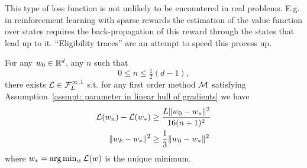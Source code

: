 \begin{remark}
	This type of loss function is not unlikely to be encountered in real
	problems. E.g. in reinforcement learning with sparse rewards the estimation
	of the value function over states requires the back-propagation of this
	reward through the states that lead up to it. ``Eligibility traces''
	\parencite[Chapter 12]{suttonReinforcementLearningIntroduction2018}
	are an attempt to speed this process up.
\end{remark}
\begin{theorem}\label{thm: convex function complexity bound}
	For any \(\weights_0\in\reals^d\), any \(n\) such that 
	\[0\le n\le \tfrac12 (d-1),\]
	there exists \(\Loss\in\lipGradientSet[\infty,1]{\ubound}\)
	s.t. for any first order method \(\firstOrderMethod\)
	satisfying Assumption~\ref{assmpt: parameter in linear hull of gradients}
	we have
	\begin{subequations}
	\begin{align}
		\Loss(\weights_n) - \Loss(\minimum)
		&\ge \frac{\ubound \|\weights_0 - \minimum\|^2}{16(n+1)^2} \\
		\|\weights_k -\minimum\|^2 
		&\ge \frac13 \|\weights_0 - \minimum\|^2
	\end{align}
	\end{subequations}
	where \(\minimum = \arg\min_\weights \Loss(\weights)\) is the unique minimum.
\end{theorem}

